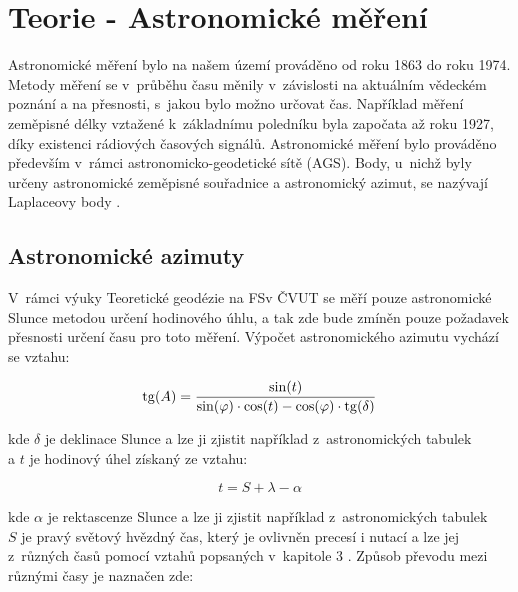 \chapter{Teorie - Astronomické měření}
\label{3-teorie-astronomickeho-mereni}
Astronomické měření bylo na našem území prováděno od roku 1863 do roku 1974. Metody měření se v~průběhu času měnily v~závislosti na aktuálním vědeckém poznání a na přesnosti, s~jakou bylo možno určovat čas. Například měření zeměpisné délky vztažené k~základnímu poledníku byla započata až roku 1927, díky existenci rádiových časových signálů. Astronomické měření bylo prováděno především v~rámci astronomicko-geodetické sítě (AGS). Body, u~nichž byly určeny astronomické země\-pisné souřadnice a astronomický azimut, se nazývají Laplaceovy body \cite{kostelecky_geodeticka_astronomie}.

\section{Astronomické azimuty}
V~rámci výuky Teoretické geodézie na FSv ČVUT se měří pouze astronomické  Slunce metodou určení hodinového úhlu, a tak zde bude zmíněn pouze požadavek přesnosti určení času pro toto měření. Výpočet astronomického azimutu vychází se vztahu:

\begin{equation}    
\mathrm{tg}{(A)} = \frac{\sin(t)}{\sin(\varphi) \cdot \cos(t) - \cos(\varphi) \cdot \mathrm{tg}(\delta)}
\end{equation}

kde \(\delta\) je deklinace Slunce a lze ji zjistit například z~astronomických tabulek\\
a \(t\) je hodinový úhel získaný ze vztahu:

\begin{equation}
    t = S+\lambda-\alpha
\end{equation}

kde \(\alpha\) je rektascenze Slunce a lze ji zjistit například z~astronomických tabulek\\

\(S\) je pravý světový hvězdný čas, který je ovlivněn precesí i nutací a lze jej  z~různých časů pomocí vztahů popsaných v~kapitole 3 \cite{kostelecky_geodeticka_astronomie}. Způsob převodu mezi různými časy je naznačen zde: 

